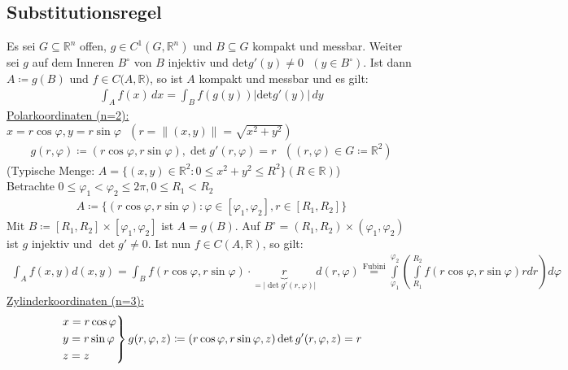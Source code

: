 \subsection{Substitutionsregel}
\label{sec: Sub}
Es sei $G \subseteq \mathbb{R}^n$ offen, $g \in C^1(G,\mathbb{R}^n)$ und $B \subseteq G$ kompakt und messbar. Weiter sei $g$ auf dem Inneren $B^\circ$ von $B$ injektiv
und det$g'(y) \neq 0 \text{ } (y \in B^\circ)$. Ist dann $A \coloneqq g(B)$ und $f \in C(A,\mathbb{R)}$, so ist $A$ kompakt und messbar und es gilt:
\begin{align*}
    \int_A f(x)\,dx = \int_B f(g(y)) \lvert \text{det} g'(y)\rvert\,dy
\end{align*}
\underline{Polarkoordinaten (n=2):} \\
$x = r\cos \varphi, y = r\sin \varphi \text{ } (r = \lVert(x,y)\rVert = \sqrt{x^2 + y^2})$
\begin{align*}
    g(r,\varphi) \coloneqq (r\cos \varphi, r\sin \varphi), \det g'(r,\varphi) = r \text{ } ((r,\varphi) \in G \coloneqq \mathbb{R}^2)
\end{align*}
(Typische Menge: $A=\{ (x,y) \in \mathbb{R}^2: 0 \leq x^2+y^2\leq R^2\} (R \in \mathbb{R})$) \\
Betrachte $0 \leq \varphi_1 < \varphi_2 \leq 2\pi, 0 \leq R_1 < R_2$
\begin{align*}
    A \coloneqq \{ (r\cos \varphi, r\sin \varphi): \varphi \in [\varphi_1,\varphi_2], r \in [R_1,R_2]\}
\end{align*}
Mit $B \coloneqq [R_1,R_2] \times [\varphi_1, \varphi_2]$ ist $A = g(B)$. Auf $B^\circ = (R_1,R_2) \times (\varphi_1,\varphi_2)$ ist $g$ injektiv und $\det g' \neq 0$.
Ist nun $f \in C(A,\mathbb{R})$, so gilt: 
\begin{align*}
    \int_A f(x,y) d(x,y) = \int_B f(r \cos \varphi,r \sin \varphi) \cdot \underbrace{r}_{= \lvert \det g'(r,\varphi)\rvert} d(r, \varphi) \stackrel{\text{Fubini}}{=}
    \int \limits_{\varphi_1}^{\varphi_2} (\int \limits_{R_1}^{R_2} f(r \cos \varphi, r \sin \varphi)r dr) d\varphi
\end{align*}
\underline{Zylinderkoordinaten (n=3):} \\
\begin{align*}
    \begin{rcases} 
        x = r \cos \varphi \\
        y = r \sin \varphi \\
        z = z \\
    \end{rcases} g(r,\varphi,z) \coloneqq (r \cos \varphi,r \sin \varphi, z) \det g'(r,\varphi,z) = r
\end{align*}

